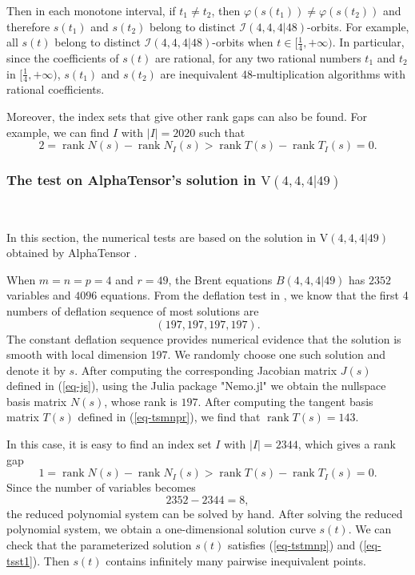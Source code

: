 \documentclass[reqno]{amsart}
\theoremstyle{definition}
\numberwithin{equation}{section}
\theoremstyle{remark}
\begin{document}
Then in each monotone interval, if $t_1\neq t_2$, then $\varphi (s(t_1))\neq\varphi (s(t_2))$ and therefore
$s(t_1)$ and $s(t_2)$ belong to distinct $\mathcal{I}(4,4,4|48)$-orbits.
For example, all $s(t)$ belong to distinct $\mathcal{I}(4,4,4|48)$-orbits  when  $t\in[\frac{1}{4},+\infty)$. In particular, since the coefficients of $s(t)$ are rational, for any two rational numbers $t_1$ and $t_2$ in $[\frac{1}{4},+\infty)$, $s(t_1)$ and $s(t_2)$ are inequivalent 48-multiplication algorithms with rational coefficients.

Moreover, the index sets that give other rank gaps can also be found. For example, we can find $I$ with $|I|=2020$ such that
\begin{equation*} 
2=\operatorname{rank}N(s)-\operatorname{rank}N_I(s)>\operatorname{rank}T(s)-\operatorname{rank}T_I(s)=0.
\end{equation*}


\subsubsection{The test on AlphaTensor's solution in $\mathrm{V}(4,4,4|49)$}
\

In this section, the numerical tests are based on the solution in $\mathrm{V}(4,4,4|49)$ obtained by AlphaTensor \cite{Faw22}. 

When $m=n=p=4$ and $r=49$, the Brent equations $B(4,4,4|49)$ has 
$2352$ variables and $4096$ equations. From the deflation test in \cite{li25def}, we know that the first 4 numbers of deflation sequence of most solutions are
$$(197,197,197,197).$$
The constant deflation sequence provides numerical evidence that
the solution is smooth with local dimension 197.
We randomly choose one such solution and denote it by $s$.
After computing the corresponding Jacobian matrix $J(s)$ defined in (\ref{eq-js}), using the Julia package "Nemo.jl" we obtain the nullspace basis matrix $N(s)$, whose rank is $197$. After computing the tangent basis matrix $T(s)$ defined in (\ref{eq-tsmnpr}), we find that $\operatorname{rank}T(s)=143$.

In this case, it is easy to find an index set $I$ with $|I|=2344$, which gives a rank gap
\begin{equation*} 
1=\operatorname{rank}N(s)-\operatorname{rank}N_I(s)>\operatorname{rank}T(s)-\operatorname{rank}T_I(s)=0.
\end{equation*}
Since the number of variables becomes 
$$2352-2344=8,$$
the reduced polynomial system can be solved by hand. After solving the reduced polynomial system, we obtain a one-dimensional solution curve $s(t)$. We can check that the parameterized solution $s(t)$ satisfies (\ref{eq-tstmnp}) and (\ref{eq-tsst1}). Then $s(t)$ contains infinitely many pairwise inequivalent points.
\end{document}
